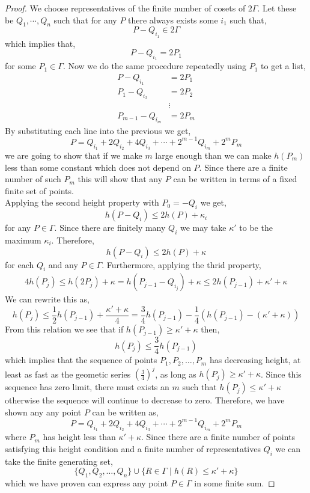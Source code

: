 \documentclass{article}
\theoremstyle{definition}
\begin{document}
\begin{proof}
We choose representatives of the finite number of cosets of $2 \Gamma$. Let these be $Q_1, \cdots, Q_n$ such that for any $P$ there always exists some $i_1$ such that,
\[ P - Q_{i_1} \in 2 \Gamma \]
which implies that,
\[ P - Q_{i_1} = 2 P_1 \]
for some $P_1 \in \Gamma$. Now we do the same procedure repeatedly using $P_1$ to get a list,
\begin{align*}
P - Q_{i_1} & = 2 P_1
\\
P_1 - Q_{i_2} & = 2 P_2
\\
& \vdots
\\
P_{m-1} - Q_{i_m} & = 2 P_m
\end{align*}
By substituting each line into the previous we get,
\[ P = Q_{i_1} + 2 Q_{i_2} + 4 Q_{i_3} + \cdots + 2^{m-1} Q_{i_m} + 2^m P_m \]
we are going to show that if we make $m$ large enough than we can make $h(P_m)$ less than some constant which does not depend on $P$. Since there are a finite number of such $P_m$ this will show that any $P$ can be written in terms of a fixed finite set of points. 
\bigskip\\
Applying the second height property with $P_0 = - Q_i$ we get,
\[ h(P - Q_i) \le 2 h(P) + \kappa_i \]
for any $P \in \Gamma$. Since there are finitely many $Q_i$ we may take $\kappa'$ to be the maximum $\kappa_i$. Therefore,
\[ h(P - Q_i) \le 2 h(P) + \kappa \]
for each $Q_i$ and any $P \in \Gamma$. Furthermore, applying the thrid property,
\begin{align*}
4 h(P_j) \le h(2 P_j) + \kappa = h(P_{j-1} - Q_{i_j}) + \kappa \le 2 h(P_{j - 1}) + \kappa' + \kappa 
\end{align*}
We can rewrite this as,
\[ h(P_j) \le \frac{1}{2} h(P_{j-1}) + \frac{\kappa' + \kappa}{4} = \frac{3}{4} h(P_{j-1}) - \frac{1}{4}(h(P_{j-1}) - (\kappa' + \kappa)) \]
From this relation we see that if $h(P_{j-1}) \ge \kappa' + \kappa$ then,
\[ h(P_j) \le \frac{3}{4} h(P_{j-1}) \]
which implies that the sequence of points $P_1, P_2, \dots, P_m$ has decreasing height, at least as fast as the geometic series $\left( \frac{3}{4} \right)^j$, as long as $h(P_j) \ge \kappa' + \kappa$. Since this sequence has zero limit, there must exists an $m$ such that $h(P_j) \le \kappa' + \kappa$ otherwise the sequence will continue to decrease to zero. Therefore, we have shown any any point $P$ can be written as,
\[ P = Q_{i_1} + 2 Q_{i_2} + 4 Q_{i_3} + \cdots + 2^{m-1} Q_{i_m} + 2^m P_m \]
where $P_m$ has height less than $\kappa' + \kappa$. Since there are a finite number of points satisfying this height condition and a finite number of representatives $Q_i$ we can take the finite generating set,
\[ \{ Q_1, Q_2, \dots, Q_n \} \cup \{ R \in \Gamma \mid h(R) \le \kappa' + \kappa \} \]
which we have proven can express any point $P \in \Gamma$ in some finite sum. 
\end{proof}
\end{document}

